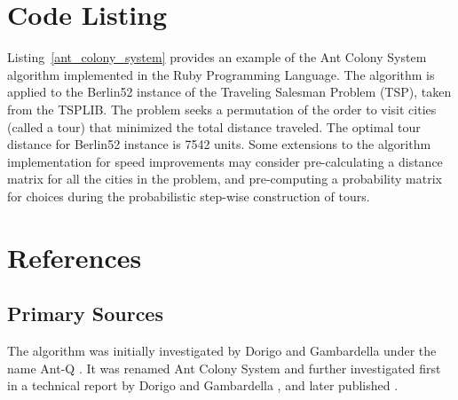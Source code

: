 \documentclass[a4paper, 11pt]{article}
\begin{document}
\section{Code Listing}
\label{sec:code}
Listing~\ref{ant_colony_system} provides an example of the Ant Colony System algorithm implemented in the Ruby Programming Language. 
The algorithm is applied to the Berlin52 instance of the Traveling Salesman Problem (TSP), taken from the TSPLIB. The problem seeks a permutation of the order to visit cities (called a tour) that minimized the total distance traveled. The optimal tour distance for Berlin52 instance is 7542 units.
Some extensions to the algorithm implementation for speed improvements may consider pre-calculating a distance matrix for all the cities in the problem, and pre-computing a probability matrix for choices during the probabilistic step-wise construction of tours. 




\section{References}
\label{sec:references}

% 
% 
\subsection{Primary Sources}
The algorithm was initially investigated by Dorigo and Gambardella under the name Ant-Q \cite{Dorigo1996a, Gambardella1995}.
It was renamed Ant Colony System and further investigated first in a technical report by Dorigo and Gambardella \cite{Dorigo1997a}, and later published \cite{Dorigo1997}.
\end{document}
